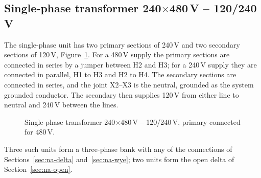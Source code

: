 \subsection{Single-phase transformer 240$\times$480\,V -- 120/240\,V}
\label{sec:na-single}

The single-phase unit has two primary sections of 240\,V and two secondary
sections of 120\,V, Figure~\ref{fig:na-single}. For a 480\,V supply the
primary sections are connected in series by a jumper between H2 and H3; for
a 240\,V supply they are connected in parallel, H1 to H3 and H2 to H4. The
secondary sections are connected in series, and the joint X2--X3 is the
neutral, grounded as the system grounded conductor. The secondary then
supplies 120\,V from either line to neutral and 240\,V between the lines.

\begin{figure}[!ht]
  \centering
  
  \caption{Single-phase transformer 240$\times$480\,V -- 120/240\,V,
  primary connected for 480\,V.}
  \label{fig:na-single}
\end{figure}

Three such units form a three-phase bank with any of the connections of
Sections~\ref{sec:na-delta} and~\ref{sec:na-wye}; two units form the open
delta of Section~\ref{sec:na-open}.
\FloatBarrier
